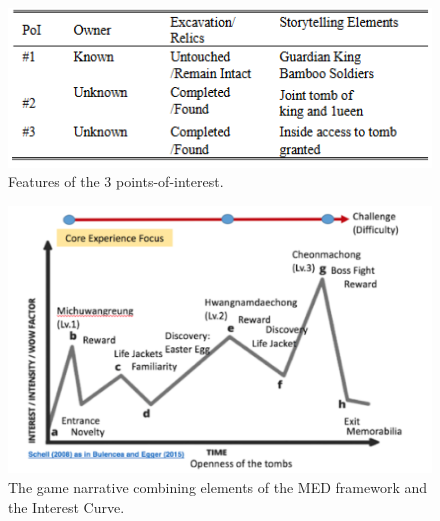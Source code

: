 \documentclass[runningheads]{llncs}
\begin{document}
\begin{figure}
    \centering
    \includegraphics[scale = 1]{PoIs.png}
    \caption{Features of the 3 points-of-interest. \cite{ref_article11}}
    \label{fig:POI}
\end{figure}

\begin{figure}
    \centering
    \includegraphics[scale = 1]{Schell.png}
    \caption{The game narrative combining elements of the MED framework and the Interest Curve. \cite{ref_article11}}
    \label{fig:InterestCurve}
\end{figure}

\end{document}

